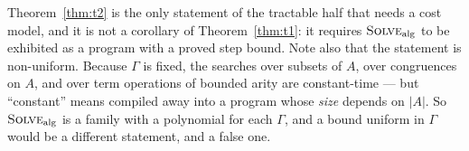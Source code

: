 \begin{hazard}\label{haz:t2-scope}
Theorem~\ref{thm:t2} is the only statement of the tractable half that needs a
cost model, and it is not a corollary of Theorem~\ref{thm:t1}: it requires
$\textsc{Solve}_{\mathrm{alg}}$ to be exhibited as a program with a proved step
bound. Note
also that the statement is non-uniform. Because $\Gamma$ is fixed, the searches
over subsets of $A$, over congruences on $A$, and over term operations of
bounded arity are constant-time --- but ``constant'' means compiled away into a
program whose \emph{size} depends on $|A|$. So $\textsc{Solve}_{\mathrm{alg}}$
is a family with a polynomial for each $\Gamma$, and a bound
uniform in $\Gamma$ would be a different statement, and a false one.
\end{hazard}

